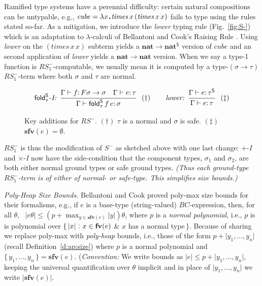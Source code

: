 \documentclass[envcountsame]{llncs}
\newcommand{\sfv}{\ensuremath{\mathbf{sfv}}}\newcommand{\ssize}[1]{\Vert #1\Vert}
\newcommand{\safe}[1]{#1^{\mathsf{S}}}
\newcommand{\folds}[1]{\mathop{\safe{\mathsf{fold}}_{#1}}}
\newcommand{\type}[1]{\ensuremath{\mathbf{#1}}\xspace}
\newcommand{\Nat}{\type{nat}}
\newcommand{\asize}[1]{\ensuremath{\mathopen{|}#1\mathclose{|}}\xspace}
\newcommand{\RS}{\mathit{RS}}
\newcommand{\RSmi}{\mathit{RS^-_1}}
\newcommand{\set}[1]{\{\,#1\,\}}
\newcommand{\entails}{\vdash}
\newcommand{\suchthat}{\mathrel{\,\stackrel{\rule{0.03em}{0.5ex}}{\rule[-.1ex]{0.03em}{0.5ex}}\,}}
\newcommand{\sqdot}{\rule{0.5mm}{0.5mm}}
\newcommand{\lam}[1]{\lambda #1\,\sqdot\,}
\newcommand{\fv}{\ensuremath{\mathbf{fv}}}
\newcommand{\of}{\colon}
\renewcommand{\colon}{\mathpunct{:}}
\newcommand{\Quad}[1]{\hspace*{#1em}}
\newcommand{\irule}[2]{\ensuremath{{\frac{\strut\textstyle #1}{\strut\textstyle #2}}}}
\newcommand{\rulelabel}[1]{\hbox{\it #1:}\Quad{0.5}}
\newcommand{\sidecond}[1]{\Quad{0.5} \left(#1\right)}
\begin{document}
Ramified type systems have a perennial difficulty: certain natural
compositions can be untypable, e.g., $\mathit{cube} =
\lam{x}\mathit{times}\,x\,(\mathit{times}\,x\,x)$ fails to type
using the rules stated so-far.  As a mitigation, we introduce the
\emph{lower} typing rule (Fig.~\ref{fig:S-}) which is an adaptation
to $\lambda$-calculi of Bellantoni and Cook's Raising Rule
\cite{BellantoniCook}.
Using \emph{lower} on the $(\mathit{times}\,x\,x)$ subterm yields a
$\Nat\to\safe\Nat$ version of $\mathit{cube}$ and an second
application of \emph{lower} yields a $\Nat\to\Nat$ version.  When we
say a type-1 function is $\RSmi$-computable, we usually mean it is
computed by a type-$(\sigma\to\tau)$ $\RSmi$-term where both
$\sigma$ and $\tau$ are normal.


\begin{figure}[t]
\begin{minipage}{\textwidth}\small
\begin{gather*}
  \rulelabel{$\folds\tau$-I}
  \irule{\Gamma \entails f\of F\sigma\to\sigma
  \Quad{1} 
  \Gamma\entails e\of\tau}{\Gamma\entails \folds\tau f \,e\of \sigma} 
  \sidecond{\dagger}
  \Quad2
  \rulelabel{lower}
  \irule{\Gamma\entails e\of\safe\tau}{
  \Gamma\entails e\of\tau}
  \sidecond{\ddagger}
\end{gather*}
\caption{Key additions for $\RS^-$.  \quad
$(\dagger)$ $\tau$ is a normal and $\sigma$ is safe.
\quad 
$(\ddagger)$  $\sfv(e)=\emptyset$.}
\label{fig:RS-}
\end{minipage}
\end{figure}



$\RSmi$ is thus the modification of $S^-$ as sketched above
with one last change:
$+$-\emph{I} and  $\times$-\emph{I} now have the side-condition
that the component  types, $\sigma_1$ and $\sigma_2$, are 
both either normal ground types or safe ground types.
\emph{(Thus each ground-type $\RSmi$-term is of either of normal- 
or safe-type. This simplifies size bounds.)}

\emph{Poly-Heap Size Bounds.}  Bellantoni and Cook proved poly-max
size bounds for their formalisms, e.g., if $e$ is a base-type
(string-valued) $BC$-expression, then, for all $\theta$, \
$|e\theta| \leq (p + \max_{y\in\sfv(e)}|y|)\theta$, where $p$ is a
\emph{normal polynomial}, i.e., $p$ is is polynomial over $\{\,|x|
\suchthat x\in\fv(e)$ \& $x$ has a normal type$\,\}$.  Because of
sharing we replace poly-max with \emph{poly-heap} bounds, i.e.,
those of the form $p+\asize{y_1,\dots,y_n}$ (recall
Definition~\ref{d:ap:size}) where $p$ is a normal polynomial and
$\set{y_1,\dots,y_n}=\sfv(e)$.  (\emph{Convention:} 
We write bounds
as $\asize{e}\leq p+\asize{y_1,\dots,y_n}$, keeping the universal
quantification over $\theta$ implicit
and in place of $\asize{y_1,\dots,y_n}$ we  write 
$\asize{\sfv(e)}$.
\end{document}
